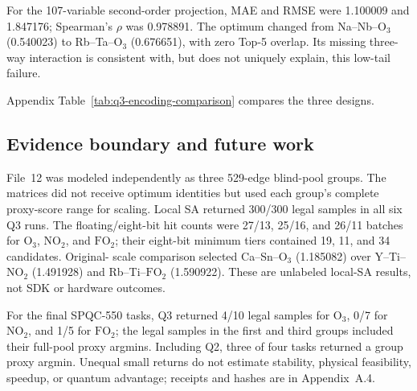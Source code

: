 For the 107-variable second-order projection, MAE and RMSE were 1.100009 and
1.847176; Spearman's $\rho$ was 0.978891.  The optimum changed from
Na--Nb--$\mathrm O_3$ (0.540023) to Rb--Ta--$\mathrm O_3$ (0.676651),
with zero Top-5 overlap.  Its missing three-way interaction is consistent
with, but does not uniquely explain, this low-tail failure.

Appendix Table~\ref{tab:q3-encoding-comparison} compares the three designs.

\subsection{Evidence boundary and future work}

File~12 was modeled independently as three 529-edge blind-pool groups.  The
matrices did not receive optimum identities but used each group's complete
proxy-score range for scaling.  Local SA returned 300/300 legal samples in
all six Q3 runs.  The floating/eight-bit hit counts were 27/13, 25/16, and
26/11 batches for $\mathrm O_3$, $\mathrm{NO}_2$, and $\mathrm{FO}_2$;
their eight-bit minimum tiers contained 19, 11, and 34 candidates.  Original-
scale comparison selected Ca--Sn--$\mathrm O_3$ (1.185082) over
Y--Ti--$\mathrm{NO}_2$ (1.491928) and Rb--Ti--$\mathrm{FO}_2$ (1.590922).
These are unlabeled local-SA results, not SDK or hardware outcomes.

For the final SPQC-550 tasks, Q3 returned 4/10 legal samples for
$\mathrm O_3$, 0/7 for $\mathrm{NO}_2$, and 1/5 for $\mathrm{FO}_2$;
the legal samples in the first and third groups included their full-pool
proxy argmins.  Including Q2, three of four tasks returned a group proxy
argmin.  Unequal small returns do not estimate stability, physical
feasibility, speedup, or quantum advantage; receipts and hashes are in
Appendix~A.4.
